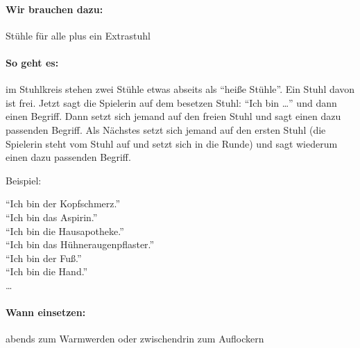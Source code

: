 \paragraph{Wir brauchen dazu:} Stühle für alle plus ein Extrastuhl
\paragraph{So geht es:} im Stuhlkreis stehen zwei Stühle etwas abseits als "`heiße Stühle"'. Ein Stuhl davon ist frei. Jetzt sagt die Spielerin auf dem besetzen Stuhl: "`Ich bin \ldots"' und dann einen Begriff. Dann setzt sich jemand auf den freien Stuhl und sagt einen dazu passenden Begriff. Als Nächstes setzt sich jemand auf den ersten Stuhl (die Spielerin steht vom Stuhl auf und setzt sich in die Runde) und sagt wiederum einen dazu passenden Begriff.

Beispiel:

"`Ich bin der Kopfschmerz."'\\
"`Ich bin das Aspirin."'\\
"`Ich bin die Hausapotheke."'\\
"`Ich bin das Hühneraugenpflaster."'\\
"`Ich bin der Fuß."'\\
"`Ich bin die Hand."'\\
\ldots
\paragraph{Wann einsetzen:} abends zum Warmwerden oder zwischendrin zum Auflockern



